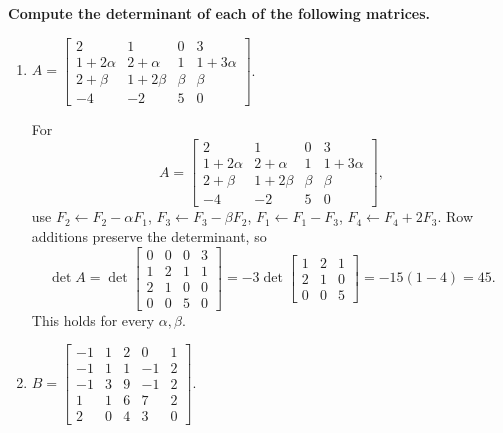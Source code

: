 \providecommand{\rank}{\operatorname{r}}
\providecommand{\RR}{\mathbb R}
\providecommand{\CC}{\mathbb C}
\providecommand{\KK}{\mathbb K}

\setcounter{enumi}{43}
\item {\bfseries\boldmath
Compute the determinant of each of the following matrices.
}

\begin{enumerate}[label=\alph*)]

\item $A=\begin{bmatrix}2&1&0&3\\1+2\alpha&2+\alpha&1&1+3\alpha\\2+\beta&1+2\beta&\beta&\beta\\-4&-2&5&0\end{bmatrix}$.

\begin{answer}
For
\[
 A=\begin{bmatrix}
2&1&0&3\\1+2\alpha&2+\alpha&1&1+3\alpha\\
2+\beta&1+2\beta&\beta&\beta\\-4&-2&5&0
\end{bmatrix},
\]
use $F_2\gets F_2-\alpha F_1$, $F_3\gets F_3-\beta F_2$,
$F_1\gets F_1-F_3$, $F_4\gets F_4+2F_3$. Row additions preserve the determinant,
so
\[
 \det A=\det\begin{bmatrix}0&0&0&3\\1&2&1&1\\2&1&0&0\\0&0&5&0\end{bmatrix}
 =-3\det\begin{bmatrix}1&2&1\\2&1&0\\0&0&5\end{bmatrix}
 =-15(1-4)=45.
\]
This holds for every $\alpha,\beta$.
\end{answer}

\item $B=\begin{bmatrix}-1&1&2&0&1\\-1&1&1&-1&2\\-1&3&9&-1&2\\1&1&6&7&2\\2&0&4&3&0\end{bmatrix}$.


\end{enumerate}
